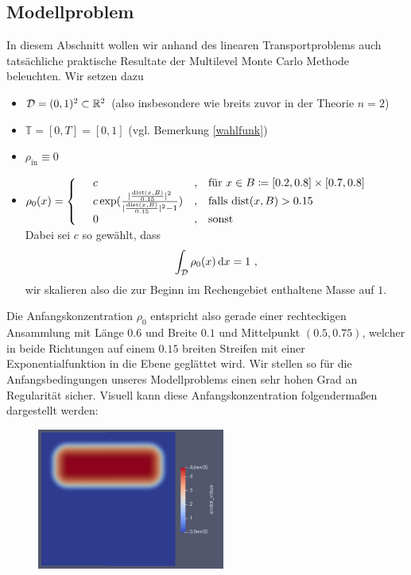 
\subsection{Modellproblem}

In diesem Abschnitt wollen wir anhand des linearen Transportproblems auch tatsächliche praktische Resultate der Multilevel Monte Carlo Methode beleuchten.
Wir setzen dazu
\begin{itemize}
	\item $ \mathcal{D} = (0,1)^2 \subset \mathbb{R}^2 $ (also insbesondere wie breits zuvor in der Theorie $ n=2 $)
	\item $ \mathbb{T} = [0,T] = [0,1] $ (vgl. Bemerkung \ref{wahlfunk})
	\item $ \rho_{\text{in}} \equiv 0 $
	\item $ \rho_0(x) = 
	\begin{cases*}
		\begin{array}{llll}
			&c & , &\text{für }x \in B \coloneqq [0.2,0.8] \times [0.7 ,0.8]  \\
			&c\exp(\frac{\abs{\frac{\text{dist}(x,B)}{0.15}}^2}{\abs{\frac{\text{dist}(x,B)}{0.15}}^2-1}) &, &\text{falls } \text{dist}(x,B)>0.15 \\
			&0 &, & \text{sonst}
		\end{array}
	\end{cases*}$ \\
	Dabei sei $ c $ so gewählt, dass 
	\[
		\int_{\mathcal{D}} \rho_0(x) \, \mathrm{d} x = 1 \ ,
	\]
	wir skalieren also die zur Beginn im Rechengebiet enthaltene Masse auf $ 1 $.
\end{itemize} 
Die Anfangskonzentration $ \rho_0 $ entspricht also gerade einer rechteckigen Ansammlung mit Länge $ 0.6$ und Breite $ 0.1$ und Mittelpunkt $ (0.5,0.75) $, welcher in beide Richtungen auf einem $ 0.15$ breiten Streifen mit einer Exponentialfunktion in die Ebene geglättet wird. 
Wir stellen so für die Anfangsbedingungen unseres Modellproblems einen sehr hohen Grad an Regularität sicher. 
Visuell kann diese Anfangskonzentration folgendermaßen dargestellt werden:
\begin{figure}[H]
	\centering
	\includegraphics[width=0.55\textwidth]{anfangsbedingung.png} 
\end{figure}
